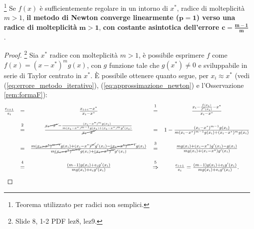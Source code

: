 \begin{theorem}\label{th:newton_converge_linearmente}
	\footnote{Teorema utilizzato per radici non semplici.}
	Se $f(x)$ è sufficientemente regolare in un intorno di $x^*$, radice di molteplicità $m>1$, \textbf{il metodo di Newton converge linearmente ($\boldsymbol{p=1}$) verso una radice di molteplicità} $\boldsymbol{m>1}$, \textbf{con costante asintotica dell'errore $\boldsymbol{c=\frac{m-1}{m}}$}.
\end{theorem}
\begin{proof}\footnote{Slide 8, 1-2 PDF lez8, lez9.}
	Sia $x^*$ radice con molteplicità $m>1$, è possibile esprimere $f$ come $f(x)=(x-x^*)^mg(x)$, con $g$ funzione tale che $g(x^*)\neq 0$ e sviluppabile in serie di Taylor centrato in $x^*$. È possibile ottenere quanto segue, per $x_i\approx x^*$ (vedi (\ref{eq:errore_metodo_iterativo}), (\ref{eq:approssimazione_newton}) e l'Osservazione \ref{rem:formaF}): 
	\begin{equation*}
		\begin{matrix}
			\frac{e_{i+1}}{e_i}&=&\frac{x_{i+i}-x^*}{x_i-x^*}&\overset{\footnotemark}{=}&\frac{x_i-\frac{f(x_i)}{f'(x_i)}-x^*}{x_i-x^*}\\\\
			&\overset{\footnotemark}{=}&\frac{\cancel{x_i-x^*}-\frac{(x_i-x^*)^mg(x_i)}{m{(x_i-x^*)^{m-1}}g(x_i)+(x_i-x^*)^mg'(x_i)}}{\cancel{x_i-x^*}}&=&1-\frac{(x_i-x^*)^{m-1}g(x_i)}{m(x_i-x^*)^{m-1}g(x_i)+(x_i-x^*)^mg(x_i)}\\\\
			&=&\frac{m(\cancel{x_i-x^*)^{m-1}}g(x_i)+(x_i-x^*)^{\cancel{m}}g'(x_i)-\cancel{(x_i-x^*)^{m-1}}g(x_i)}{m\cancel{(x_i-x^*)^{m-1}}g(x_i)+\cancel{(x_i-x^*)^m}g'(x_i)}&\overset{\footnotemark}{=}&\frac{mg(x_i)+(x_i-x^*)g'(x_i)-g(x_i)}{mg(x_i)+(x_i-x^*)g'(x_i)}\\\\
			&\overset{\footnotemark}{=}&\frac{(m-1)g(x_i)+e_ig'(x_i)}{mg(x_i)+e_ig'(x_i)}&\overset{\footnotemark}{\Rightarrow}&\frac{e_{i+1}}{e_i}=\frac{(m-1)g(x_i)+e_ig'(x_i)}{mg(x_i)+e_ig'(x_i)}.
		\end{matrix}
	\end{equation*}
	
	\addtocounter{footnote}{-4}
	
	
	

\end{proof}
